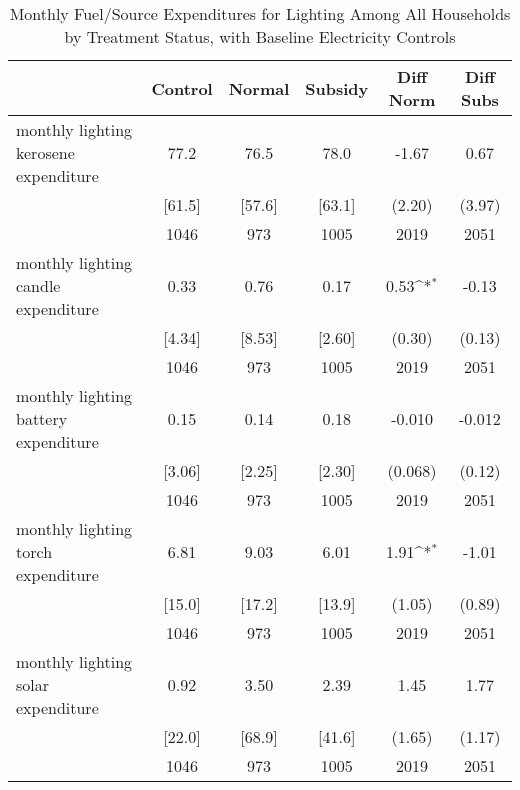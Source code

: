 \begin{table}[htbp]\centering
\def\sym#1{\ifmmode^{#1}\else\(^{#1}\)\fi}
\caption{Monthly Fuel/Source Expenditures for Lighting Among All Households by Treatment Status, with Baseline Electricity Controls \label{tab:"balance"}}
\begin{tabular*}{0.9\hsize}{@{\hskip\tabcolsep\extracolsep\fill}l*{1}{ccccc}}
\toprule
                                &  Control&   Normal&  Subsidy&Diff Norm         &Diff Subs         \\
\midrule
monthly lighting kerosene expenditure&     77.2&     76.5&     78.0&    -1.67         &     0.67         \\
                                &   [61.5]&   [57.6]&   [63.1]&   (2.20)         &   (3.97)         \\
                                &     1046&      973&     1005&     2019         &     2051         \\
monthly lighting candle expenditure&     0.33&     0.76&     0.17&     0.53\sym{*}  &    -0.13         \\
                                &   [4.34]&   [8.53]&   [2.60]&   (0.30)         &   (0.13)         \\
                                &     1046&      973&     1005&     2019         &     2051         \\
monthly lighting battery expenditure&     0.15&     0.14&     0.18&   -0.010         &   -0.012         \\
                                &   [3.06]&   [2.25]&   [2.30]&  (0.068)         &   (0.12)         \\
                                &     1046&      973&     1005&     2019         &     2051         \\
monthly lighting torch expenditure&     6.81&     9.03&     6.01&     1.91\sym{*}  &    -1.01         \\
                                &   [15.0]&   [17.2]&   [13.9]&   (1.05)         &   (0.89)         \\
                                &     1046&      973&     1005&     2019         &     2051         \\
monthly lighting solar expenditure&     0.92&     3.50&     2.39&     1.45         &     1.77         \\
                                &   [22.0]&   [68.9]&   [41.6]&   (1.65)         &   (1.17)         \\
                                &     1046&      973&     1005&     2019         &     2051         \\

\end{tabular*}
\end{table}
